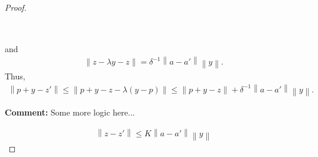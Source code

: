 \documentclass{article}
\newenvironment{comment}
  {\par\medskip
   \color{red}%
   \begin{framed}
   \textbf{Comment: }\ignorespaces}
 {\end{framed}
  \medskip}
\theoremstyle{case}
\numberwithin{theorem}{subsection}
\begin{document}
\begin{proof}
\begin{align*}
\\
\\
\\
\\
\\
\end{align*}

and
\begin{align*}
\left\|z - \lambda y - z\right\| = \delta^{-1}\left\|a - a'\right\|\left\|y\right\|.
\end{align*}
Thus,
\begin{align*}
\left\|p + y - z'\right\| \le \left\|p + y - z - \lambda \left(y - p\right)\right\| \le \left\|p + y - z\right\| + \delta^{-1}\left\|a - a'\right\|\left\|y\right\|.
\end{align*}

\begin{comment}
Some more logic here...
\end{comment}

\begin{align*}
\left\|z - z'\right\| \le K \left\|a - a'\right\| \left\|y\right\|
\end{align*}






\end{proof}
\end{document}
